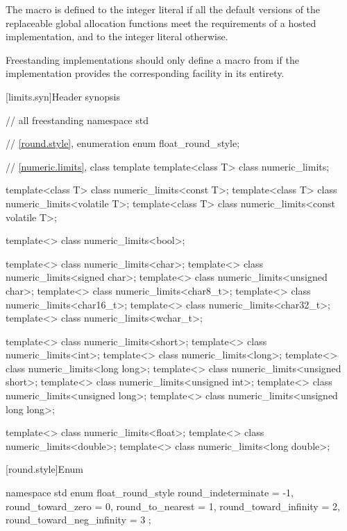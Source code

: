 \pnum
The macro  is defined to
the integer literal 
if all the default versions of the replaceable global allocation functions meet
the requirements of a hosted implementation, and
to the integer literal  otherwise.

\pnum
\recommended
Freestanding implementations should only define a macro from 
if the implementation provides the corresponding facility in its entirety.

[limits.syn]{Header  synopsis}

%
%
%
%

\begin{codeblock}
// all freestanding
namespace std {
  // \ref{round.style}, enumeration 
  enum float_round_style;

  // \ref{numeric.limits}, class template 
  template<class T> class numeric_limits;

  template<class T> class numeric_limits<const T>;
  template<class T> class numeric_limits<volatile T>;
  template<class T> class numeric_limits<const volatile T>;

  template<> class numeric_limits<bool>;

  template<> class numeric_limits<char>;
  template<> class numeric_limits<signed char>;
  template<> class numeric_limits<unsigned char>;
  template<> class numeric_limits<char8_t>;
  template<> class numeric_limits<char16_t>;
  template<> class numeric_limits<char32_t>;
  template<> class numeric_limits<wchar_t>;

  template<> class numeric_limits<short>;
  template<> class numeric_limits<int>;
  template<> class numeric_limits<long>;
  template<> class numeric_limits<long long>;
  template<> class numeric_limits<unsigned short>;
  template<> class numeric_limits<unsigned int>;
  template<> class numeric_limits<unsigned long>;
  template<> class numeric_limits<unsigned long long>;

  template<> class numeric_limits<float>;
  template<> class numeric_limits<double>;
  template<> class numeric_limits<long double>;
}
\end{codeblock}

[round.style]{Enum }

%
\begin{codeblock}
namespace std {
  enum float_round_style {
    round_indeterminate       = -1,
    round_toward_zero         =  0,
    round_to_nearest          =  1,
    round_toward_infinity     =  2,
    round_toward_neg_infinity =  3
  };
}
\end{codeblock}

